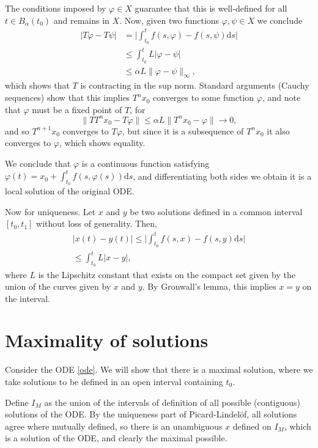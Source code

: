 \documentclass{article}
\newcommand{\dd}{\mathrm{d}}
\begin{document}
The conditions imposed by $\varphi \in X$ guarantee that this is well-defined for all $t \in B_\alpha(t_0)$ and remains in $X$. Now, given two functions $\varphi, \psi \in X$ we conclude
\begin{align*}
\lvert T \varphi - T\psi \rvert &= \lvert \int_{t_0}^t f(s, \varphi) - f(s, \psi) \dd s \rvert\\
&\leq \int_{t_0}^t L \lvert \varphi - \psi \rvert\\
&\leq \alpha L \lVert \varphi - \psi \rVert_\infty,
\end{align*}
which shows that $T$ is contracting in the sup norm. Standard arguments (Cauchy sequences) show that this implies $T^n x_0$ converges to some function $\varphi$, and note that $\varphi$ must be a fixed point of $T$, for
\[\lVert T T^n x_0 - T \varphi \rVert \leq \alpha L \lVert T^n x_0 - \varphi \rVert \to 0,\]
and so $T^{n+1} x_0$ converges to $T \varphi$, but since it is a subsequence of $T^n x_0$ it also converges to $\varphi$, which shows equality.

We conclude that $\varphi$ is a continuous function satisfying $\varphi(t) = x_0 + \int_{t_0}^t f(s, \varphi(s)) \dd s$, and differentiating both sides we obtain it is a local solution of the original ODE.

Now for uniqueness. Let $x$ and $y$ be two solutions defined in a common interval $[t_0, t_1]$ without loss of generality. Then,
\begin{align*}
\lvert x(t) - y(t) \rvert \leq \lvert \int_{t_0}^t f(s,x) - f(s,y) \dd s \rvert\\
\leq \int_{t_0}^t L \lvert x - y \rvert,
\end{align*}
where $L$ is the Lipschitz constant that exists on the compact set given by the union of the curves given by $x$ and $y$. By Gronwall's lemma, this implies $x = y$ on the interval.

\section{Maximality of solutions}

Consider the ODE \eqref{ode}. We will show that there is a maximal solution, where we take solutions to be defined in an open interval containing $t_0$.

Define $I_M$ as the union of the intervals of definition of all possible (contiguous) solutions of the ODE. By the uniqueness part of Picard-Lindelöf, all solutions agree where mutually defined, so there is an unambiguous $x$ defined on $I_M$, which is a solution of the ODE, and clearly the maximal possible.
\end{document}
